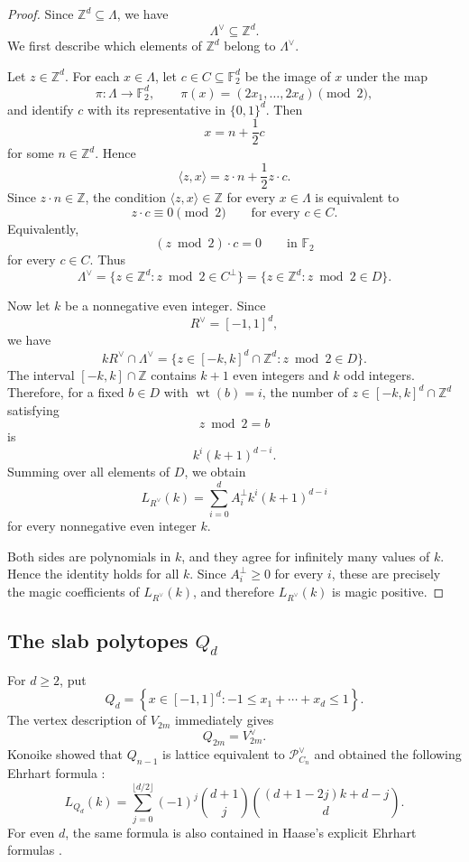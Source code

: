 \documentclass[10pt,a4paper]{amsart}
\theoremstyle{definition}
\newcommand{\ZZ}{\mathbb Z}
\newcommand{\PP}{\mathcal P}
\begin{document}
\begin{proof}
Since $\ZZ^d\subseteq\Lambda$, we have
\[
\Lambda^\vee\subseteq\ZZ^d.
\]
We first describe which elements of $\ZZ^d$ belong to $\Lambda^\vee$.

Let $z\in\ZZ^d$.  For each $x\in\Lambda$, let
$c\in C\subseteq\mathbb F_2^d$ be the image of $x$ under the map
\[
\pi:\Lambda\longrightarrow\mathbb F_2^d,
\qquad
\pi(x)=(2x_1,\ldots,2x_d)\pmod 2,
\]
and identify $c$ with its representative in $\{0,1\}^d$.
Then
\[
x=n+\frac12c
\]
for some $n\in\ZZ^d$.  Hence
\[
\langle z,x\rangle
=
z\cdot n+\frac12 z\cdot c.
\]
Since $z\cdot n\in\ZZ$, the condition
$\langle z,x\rangle\in\ZZ$ for every $x\in\Lambda$ is equivalent to
\[
z\cdot c\equiv0\pmod 2
\qquad
\text{for every }c\in C.
\]
Equivalently,
\[
(z\bmod 2)\cdot c=0
\qquad
\text{in }\mathbb F_2
\]
for every $c\in C$.  Thus
\[
\Lambda^\vee
=
\{z\in\ZZ^d:z\bmod2\in C^\perp\}
=
\{z\in\ZZ^d:z\bmod2\in D\}.
\]

Now let $k$ be a nonnegative even integer.  Since
\[
R^\vee=[-1,1]^d,
\]
we have
\[
kR^\vee\cap\Lambda^\vee
=
\{z\in[-k,k]^d\cap\ZZ^d:z\bmod2\in D\}.
\]
The interval $[-k,k]\cap\ZZ$ contains $k+1$ even integers and $k$
odd integers.  Therefore, for a fixed $b\in D$ with
$\operatorname{wt}(b)=i$, the number of $z\in[-k,k]^d\cap\ZZ^d$
satisfying
\[
z\bmod2=b
\]
is
\[
k^i(k+1)^{d-i}.
\]
Summing over all elements of $D$, we obtain
\[
L_{R^\vee}(k)
=
\sum_{i=0}^d
A_i^\perp k^i(k+1)^{d-i}
\]
for every nonnegative even integer $k$.

Both sides are polynomials in $k$, and they agree for infinitely many
values of $k$.  Hence the identity holds for all $k$.  Since
$A_i^\perp\ge0$ for every $i$, these are precisely the magic
coefficients of $L_{R^\vee}(k)$, and therefore
$L_{R^\vee}(k)$ is magic positive.
\end{proof}


\subsection{The slab polytopes \texorpdfstring{$Q_d$}{Q d}}\label{sec:slab}

For $d\ge2$, put
\[
Q_d
=
\left\{
x\in[-1,1]^d:
-1\le x_1+\cdots+x_d\le1
\right\}.
\]
The vertex description of $V_{2m}$ immediately gives
\[
Q_{2m}=V_{2m}^\vee.
\]
Konoike showed that $Q_{n-1}$ is lattice equivalent to
$\PP_{C_n}^\vee$ and obtained the following Ehrhart formula
\cite[Proposition~4.6 and its proof]{KonoikeCycles}:
\begin{equation}\label{eq:Q-ehrhart}
L_{Q_d}(k)
=
\sum_{j=0}^{\lfloor d/2\rfloor}
(-1)^j\binom{d+1}{j}
\binom{(d+1-2j)k+d-j}{d}.
\end{equation}
For even $d$, the same formula is also contained in Haase's explicit
Ehrhart formulas
\cite[Proposition~IV.2.7]{HaaseThesis}.
\end{document}
